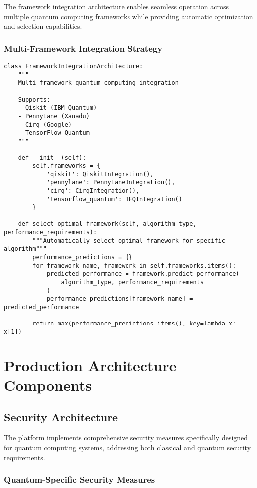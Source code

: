 \documentclass[12pt,a4paper]{report}
\begin{document}
The framework integration architecture enables seamless operation across multiple quantum computing frameworks while providing automatic optimization and selection capabilities.

\subsubsection{Multi-Framework Integration Strategy}

\begin{lstlisting}
class FrameworkIntegrationArchitecture:
    """
    Multi-framework quantum computing integration

    Supports:
    - Qiskit (IBM Quantum)
    - PennyLane (Xanadu)
    - Cirq (Google)
    - TensorFlow Quantum
    """

    def __init__(self):
        self.frameworks = {
            'qiskit': QiskitIntegration(),
            'pennylane': PennyLaneIntegration(),
            'cirq': CirqIntegration(),
            'tensorflow_quantum': TFQIntegration()
        }

    def select_optimal_framework(self, algorithm_type, performance_requirements):
        """Automatically select optimal framework for specific algorithm"""
        performance_predictions = {}
        for framework_name, framework in self.frameworks.items():
            predicted_performance = framework.predict_performance(
                algorithm_type, performance_requirements
            )
            performance_predictions[framework_name] = predicted_performance

        return max(performance_predictions.items(), key=lambda x: x[1])
\end{lstlisting}

\section{Production Architecture Components}

\subsection{Security Architecture}

The platform implements comprehensive security measures specifically designed for quantum computing systems, addressing both classical and quantum security requirements.

\subsubsection{Quantum-Specific Security Measures}
\end{document}
